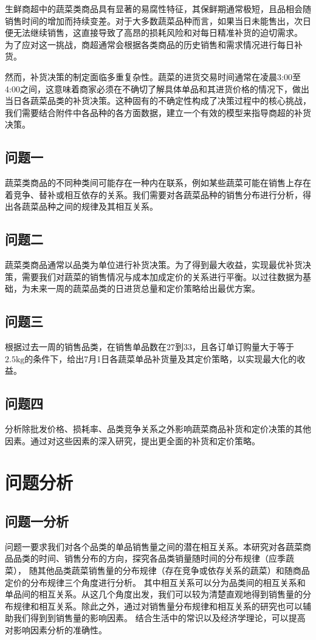 \documentclass{article}
\begin{document}
生鲜商超中的蔬菜类商品具有显著的易腐性特征，其保鲜期通常极短，且品相会随销售时间的增加而持续变差。对于大多数蔬菜品种而言，如果当日未能售出，次日便无法继续销售，这直接导致了高昂的损耗风险和对每日精准补货的迫切需求。
为了应对这一挑战，商超通常会根据各类商品的历史销售和需求情况进行每日补货。

然而，补货决策的制定面临多重复杂性。蔬菜的进货交易时间通常在凌晨3:00至4:00之间，这意味着商家必须在不确切了解具体单品和其进货价格的情况下，做出当日各蔬菜品类的补货决策。这种固有的不确定性构成了决策过程中的核心挑战，
我们需要结合附件中各品种的各方面数据，建立一个有效的模型来指导商超的补货决策。



\subsection{问题一}

蔬菜类商品的不同种类间可能存在一种内在联系，例如某些蔬菜可能在销售上存在着竞争、替补或相互依存的关系。我们需要对各蔬菜品种的销售分布进行分析，得出各蔬菜品种之间的规律及其相互关系。

\subsection{问题二}

蔬菜类商品通常以品类为单位进行补货决策。为了得到最大收益，实现最优补货决策，需要我们对蔬菜的销售情况与成本加成定价的关系进行平衡。以过往数据为基础，为未来一周的蔬菜品类的日进货总量和定价策略给出最优方案。
\subsection{问题三}

根据过去一周的销售品类，在销售单品数在$27$到$33$，且各订单订购量大于等于$2.5 \text{kg}$的条件下，给出7月1日各蔬菜单品补货量及其定价策略，以实现最大化的收益。
\subsection{问题四}

分析除批发价格、损耗率、品类竞争关系之外影响蔬菜商品补货和定价决策的其他因素。通过对这些因素的深入研究，提出更全面的补货和定价策略。
\section{问题分析}

\subsection{问题一分析}
问题一要求我们对各个品类的单品销售量之间的潜在相互关系。本研究对各蔬菜商品品类的时间、销售分布的方向，探究各品类销量随时间的分布规律（应季蔬菜），
随其他品类蔬菜销售量的分布规律（存在竞争或依存关系的蔬菜）和随商品定价的分布规律三个角度进行分析。
其中相互关系可以分为品类间的相互关系和单品间的相互关系。从这几个角度出发，我们可以较为清楚直观地得到销售量的分布规律和相互关系。除此之外，通过对销售量分布规律和相互关系的研究也可以辅助我们得到到销售量的影响因素。
结合生活中的常识以及经济学理论，可以提高对影响因素分析的准确性。
\end{document}
